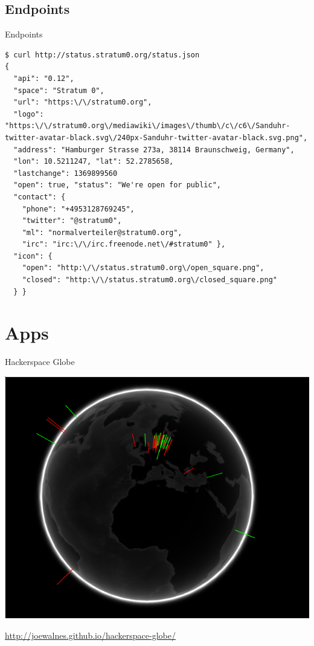 \documentclass{beamer}
\begin{document}
\subsection{Endpoints}
\begin{frame}[fragile]{Endpoints}
\begin{lstlisting}
$ curl http://status.stratum0.org/status.json
{
  "api": "0.12",
  "space": "Stratum 0",
  "url": "https:\/\/stratum0.org",
  "logo": "https:\/\/stratum0.org\/mediawiki\/images\/thumb\/c\/c6\/Sanduhr-twitter-avatar-black.svg\/240px-Sanduhr-twitter-avatar-black.svg.png",
  "address": "Hamburger Strasse 273a, 38114 Braunschweig, Germany",
  "lon": 10.5211247, "lat": 52.2785658,
  "lastchange": 1369899560
  "open": true, "status": "We're open for public",
  "contact": {
    "phone": "+4953128769245",
    "twitter": "@stratum0",
    "ml": "normalverteiler@stratum0.org",
    "irc": "irc:\/\/irc.freenode.net\/#stratum0" },
  "icon": {
    "open": "http:\/\/status.stratum0.org\/open_square.png",
    "closed": "http:\/\/status.stratum0.org\/closed_square.png"
  } }
\end{lstlisting}
\end{frame}

\section{Apps}
\begin{frame}{Hackerspace Globe}
\begin{center}
\includegraphics[height=0.7\textheight]{hackerspace-globe.png}

\url{http://joewalnes.github.io/hackerspace-globe/}
\end{center}
\end{frame}
\end{document}
